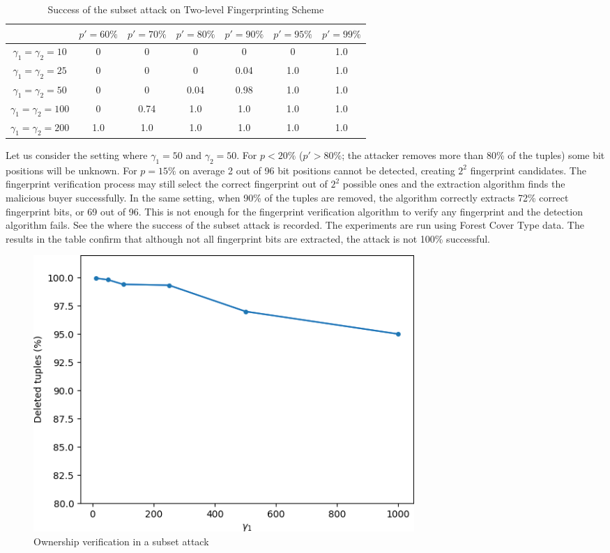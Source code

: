 \begin{table}[ht]
    \centering
    \caption{Success of the subset attack on Two-level Fingerprinting Scheme}
    \label{tab:subset-attack-two-level}
    \begin{tabular}{|c|c|c|c|c|c|c|}
        \hline
         & $p'=60\%$ & $p'=70\%$ & $p'=80\%$ & $p'=90\%$ & $p'=95\%$ & $p'=99\%$ \\
         \hline
         $\gamma_1 = \gamma_2 = 10$ & 0 & 0 & 0 & 0 & 0 & 1.0 \\
         \hline
         $\gamma_1 = \gamma_2 = 25$ & 0 & 0 & 0 & 0.04 & 1.0 & 1.0 \\
         \hline
         $\gamma_1 = \gamma_2 = 50$ & 0 & 0 & 0.04 & 0.98 & 1.0 & 1.0 \\
         \hline
         $\gamma_1 = \gamma_2 = 100$ & 0 & 0.74 & 1.0 & 1.0 & 1.0 & 1.0 \\
         \hline
         $\gamma_1 = \gamma_2 = 200$ & 1.0 & 1.0 & 1.0 & 1.0 & 1.0 & 1.0 \\
         \hline
    \end{tabular}
\end{table}

Let us consider the setting where $\gamma_1=50$ and $\gamma_2=50$. For $p<20\%$ ($p'>80\%$; the attacker removes more than 80\% of the tuples) some bit positions will be unknown. For $p=15\%$ on average 2 out of 96 bit positions cannot be detected, creating $2^2$ fingerprint candidates. 
The fingerprint verification process may still select the correct fingerprint out of $2^2$ possible ones and the extraction algorithm finds the malicious buyer successfully. 
In the same setting, when 90\% of the tuples are removed, the algorithm correctly extracts 72\% correct fingerprint bits, or 69 out of 96. 
This is not enough for the fingerprint verification algorithm to verify any fingerprint and the detection algorithm fails. 
See the  where the success of the subset attack is recorded. 
The experiments are run using Forest Cover Type data. 
The results in the table confirm that although not all fingerprint bits are extracted, the attack is not 100\% successful. 

\begin{figure}
    \centering
    \includegraphics[width=0.7\textwidth]{Figures/subset_attack_two-level-ownership-ver.png}
    \caption{Ownership verification in a subset attack}
    \label{fig:subset-attack-ownership-verification}
\end{figure}

